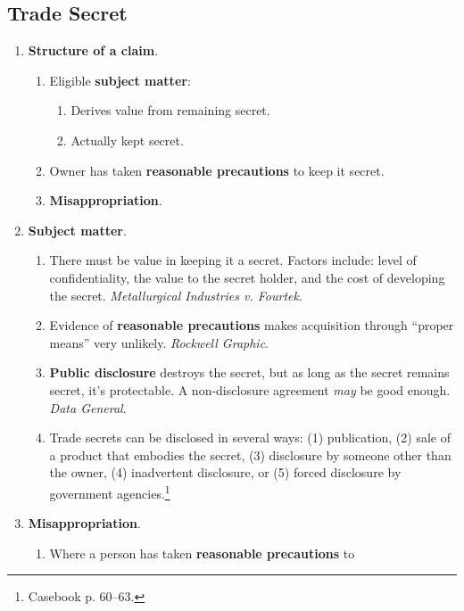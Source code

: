 \newpage

\subsection{Trade Secret}

\begin{enumerate}
    \item \textbf{Structure of a claim}.
    \begin{enumerate}
        \item Eligible \textbf{subject matter}:
        \begin{enumerate}
            \item Derives value from remaining secret.
            \item Actually kept secret.
        \end{enumerate}
        \item Owner has taken \textbf{reasonable precautions} to keep it 
        secret.
        \item \textbf{Misappropriation}.
    \end{enumerate}
    \item \textbf{Subject matter}.
    \begin{enumerate}
        \item There must be value in keeping it a secret. Factors include: 
        level of confidentiality, the value to the secret holder, and the cost 
        of developing the secret. \emph{Metallurgical Industries v. Fourtek}.
        \item Evidence of \textbf{reasonable precautions} makes acquisition 
        through ``proper means'' very unlikely. \emph{Rockwell Graphic}.
        \item \textbf{Public disclosure} destroys the secret, but as long as 
        the secret remains secret, it's protectable. A non-disclosure 
        agreement \emph{may} be good enough. \emph{Data General}.
        \item Trade secrets can be disclosed in several ways: (1) publication, 
        (2) sale of a product that embodies the secret, (3) disclosure by 
        someone other than the owner, (4) inadvertent disclosure, or (5) 
        forced disclosure by government agencies.\footnote{Casebook p. 
        60--63.}
    \end{enumerate}
    \item \textbf{Misappropriation}.
    \begin{enumerate}
        \item Where a person has taken \textbf{reasonable precautions} to 

\end{enumerate}
\end{enumerate}
